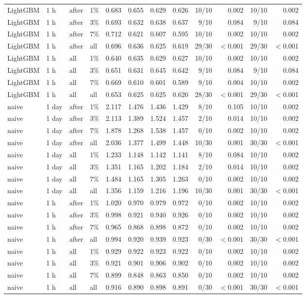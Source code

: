 \documentclass[11pt,a4paper]{article}
\begin{document}
\begin{longtable}{@{}l l l l r r r r r r r r@{}}
LightGBM & 1 h & after & 1\% & 0.683 & 0.655 & 0.629 & 0.626 & 10/10 & 0.002 & 10/10 & 0.002 \\
LightGBM & 1 h & after & 3\% & 0.693 & 0.632 & 0.638 & 0.637 & 9/10 & 0.084 & 9/10 & 0.084 \\
LightGBM & 1 h & after & 7\% & 0.712 & 0.621 & 0.607 & 0.595 & 10/10 & 0.002 & 10/10 & 0.002 \\
LightGBM & 1 h & after & all & 0.696 & 0.636 & 0.625 & 0.619 & 29/30 & $<$0.001 & 29/30 & $<$0.001 \\
LightGBM & 1 h & all & 1\% & 0.640 & 0.635 & 0.629 & 0.627 & 10/10 & 0.002 & 10/10 & 0.002 \\
LightGBM & 1 h & all & 3\% & 0.651 & 0.631 & 0.645 & 0.642 & 9/10 & 0.084 & 9/10 & 0.084 \\
LightGBM & 1 h & all & 7\% & 0.669 & 0.610 & 0.601 & 0.589 & 9/10 & 0.004 & 10/10 & 0.002 \\
LightGBM & 1 h & all & all & 0.653 & 0.625 & 0.625 & 0.620 & 28/30 & $<$0.001 & 29/30 & $<$0.001 \\
\midrule
naive & 1 day & after & 1\% & 2.117 & 1.476 & 1.436 & 1.429 & 8/10 & 0.105 & 10/10 & 0.002 \\
naive & 1 day & after & 3\% & 2.113 & 1.389 & 1.524 & 1.457 & 2/10 & 0.014 & 10/10 & 0.002 \\
naive & 1 day & after & 7\% & 1.878 & 1.268 & 1.538 & 1.457 & 0/10 & 0.002 & 10/10 & 0.002 \\
naive & 1 day & after & all & 2.036 & 1.377 & 1.499 & 1.448 & 10/30 & 0.001 & 30/30 & $<$0.001 \\
naive & 1 day & all & 1\% & 1.233 & 1.148 & 1.142 & 1.141 & 8/10 & 0.084 & 10/10 & 0.002 \\
naive & 1 day & all & 3\% & 1.351 & 1.165 & 1.202 & 1.184 & 2/10 & 0.014 & 10/10 & 0.002 \\
naive & 1 day & all & 7\% & 1.484 & 1.165 & 1.305 & 1.263 & 0/10 & 0.002 & 10/10 & 0.002 \\
naive & 1 day & all & all & 1.356 & 1.159 & 1.216 & 1.196 & 10/30 & 0.001 & 30/30 & $<$0.001 \\
\midrule
naive & 1 h & after & 1\% & 1.020 & 0.970 & 0.979 & 0.972 & 0/10 & 0.002 & 10/10 & 0.002 \\
naive & 1 h & after & 3\% & 0.998 & 0.921 & 0.940 & 0.926 & 0/10 & 0.002 & 10/10 & 0.002 \\
naive & 1 h & after & 7\% & 0.965 & 0.868 & 0.898 & 0.872 & 0/10 & 0.002 & 10/10 & 0.002 \\
naive & 1 h & after & all & 0.994 & 0.920 & 0.939 & 0.923 & 0/30 & $<$0.001 & 30/30 & $<$0.001 \\
naive & 1 h & all & 1\% & 0.929 & 0.922 & 0.923 & 0.922 & 0/10 & 0.002 & 10/10 & 0.002 \\
naive & 1 h & all & 3\% & 0.921 & 0.901 & 0.906 & 0.902 & 0/10 & 0.002 & 10/10 & 0.002 \\
naive & 1 h & all & 7\% & 0.899 & 0.848 & 0.863 & 0.850 & 0/10 & 0.002 & 10/10 & 0.002 \\
naive & 1 h & all & all & 0.916 & 0.890 & 0.898 & 0.891 & 0/30 & $<$0.001 & 30/30 & $<$0.001 \\
\end{longtable}
\endgroup
\end{document}
